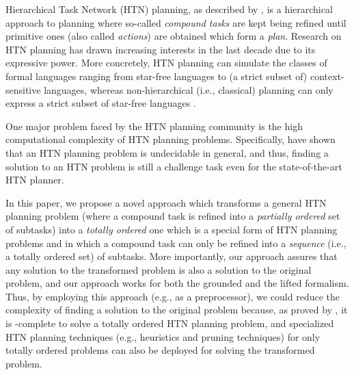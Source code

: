 Hierarchical Task Network (HTN) planning, as described by , is a hierarchical approach to planning where so-called \emph{compound tasks} are kept being refined until primitive ones (also called \emph{actions}) are obtained which form a \emph{plan}. Research on HTN planning has drawn increasing interests in the last decade due to its expressive power. More concretely, HTN planning can simulate the classes of formal languages ranging from star-free languages to (a strict subset of) context-sensitive languages, whereas non-hierarchical (i.e., classical) planning can only express a strict subset of star-free languages \cite{Hoeller2016Expressivity,Lin2022LTLExpressivity}. %

One major problem faced by the HTN planning community is the high computational complexity of HTN planning problems. Specifically,  have shown that an HTN planning problem is undecidable in general, and thus, finding a solution to an HTN problem is still a challenge task even for the state-of-the-art HTN planner.

In this paper, we propose a novel approach which transforms a general HTN planning problem (where a compound task is refined into a \emph{partially ordered} set of subtasks) into a \emph{totally ordered} one which is a special form of HTN planning problems and in which a compound task can only be refined into a \emph{sequence} (i.e., a totally ordered set) of subtasks. More importantly, our approach assures that any solution to the transformed problem is also a solution to the original problem, and our approach works for both the grounded and the lifted formalism. Thus, by employing this approach (e.g., as a preprocessor), we could reduce the complexity of finding a solution to the original problem because, as proved by , it is \EXPTIME{}-complete to solve a totally ordered HTN planning problem, and specialized HTN planning techniques (e.g., heuristics and pruning techniques) for only totally ordered problems can also be deployed for solving the transformed problem.


